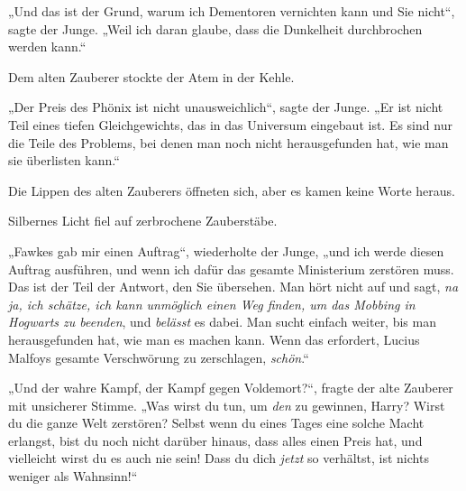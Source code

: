 „Und das ist der Grund, warum ich Dementoren vernichten kann und Sie nicht“, sagte der Junge. „Weil ich daran glaube, dass die Dunkelheit durchbrochen werden kann.“

Dem alten Zauberer stockte der Atem in der Kehle.

„Der Preis des Phönix ist nicht unausweichlich“, sagte der Junge. „Er ist nicht Teil eines tiefen Gleichgewichts, das in das Universum eingebaut ist. Es sind nur die Teile des Problems, bei denen man noch nicht herausgefunden hat, wie man sie überlisten kann.“

Die Lippen des alten Zauberers öffneten sich, aber es kamen keine Worte heraus.

Silbernes Licht fiel auf zerbrochene Zauberstäbe.

„Fawkes gab mir einen Auftrag“, wiederholte der Junge, „und ich werde diesen Auftrag ausführen, und wenn ich dafür das gesamte Ministerium zerstören muss. Das ist der Teil der Antwort, den Sie übersehen. Man hört nicht auf und sagt, \emph{na ja, ich schätze, ich kann unmöglich einen Weg finden, um das Mobbing in Hogwarts zu beenden}, und \emph{belässt} es dabei. Man sucht einfach weiter, bis man herausgefunden hat, wie man es machen kann. Wenn das erfordert, Lucius Malfoys gesamte Verschwörung zu zerschlagen, \emph{schön}.“

„Und der wahre Kampf, der Kampf gegen Voldemort?“, fragte der alte Zauberer mit unsicherer Stimme. „Was wirst du tun, um \emph{den} zu gewinnen, Harry? Wirst du die ganze Welt zerstören? Selbst wenn du eines Tages eine solche Macht erlangst, bist du noch nicht darüber hinaus, dass alles einen Preis hat, und vielleicht wirst du es auch nie sein! Dass du dich \emph{jetzt} so verhältst, ist nichts weniger als Wahnsinn!“

